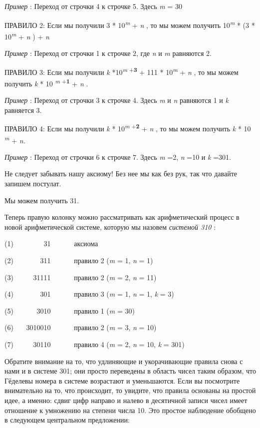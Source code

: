 \documentclass[../main.tex]{subfiles}
\begin{document}
\emph{Пример} : Переход от строчки 4 к строчке 5. Здесь \emph{m} = 30

ПРАВИЛО 2: Если мы получили 3 * 10\textsuperscript{\emph{m}} + \emph{n} , то мы можем получить 10\textsuperscript{\emph{m}} * (3 * 10\textsuperscript{\emph{m}} + \emph{n} ) + \emph{n}

\emph{Пример} : Переход от строчки 1 к строчке 2, где \emph{n} и \emph{m} равняются 2.

ПРАВИЛО 3: Если мы получили \emph{k} *10\textsuperscript{\emph{m} +\textbf{3}} + 111 * 10\textsuperscript{\emph{m}} + \emph{n} , то мы можем получить \emph{k} * 10 \textsuperscript{\emph{m} +\textbf{1}} + \emph{n} .

\emph{Пример} : Переход от строчки 3 к строчке 4. Здесь \emph{m} и \emph{n} равняются 1 и \emph{k} равняется 3.

ПРАВИЛО 4: Если мы получили \emph{k} * 10\textsuperscript{\emph{m} +\textbf{2}} + \emph{n} , то мы можем получить \emph{k} * 10 \textsuperscript{\emph{m}} + \emph{n.}

\emph{Пример} : Переход от строчки 6 к строчке 7. Здесь \emph{m} =2, \emph{n} =10 и \emph{k} =301.

Не следует забывать нашу аксиому! Без нее мы как без рук, так что давайте запишем постулат.

Мы можем получить 31.

Теперь правую колонку можно рассматривать как арифметический процесс в новой арифметической системе, которую мы назовем \emph{системой 310} :

(1)~~~~~~~~ 31~~~~~~ аксиома

(2)~~~~~~~ 311~~~~~~ правило 2 (\emph{m} = 1, \emph{n} = 1)

(3)~~~~~ 31111~~~~~~ правило 2 (\emph{m} = 2, \emph{n} = 11)

(4)~~~~~~~ 301~~~~~~ правило 3 (\emph{m} = 1, \emph{n} = 1, \emph{k} = 3)

(5)~~~~~~ 3010~~~~~~ правило 1 (\emph{m} = 30)

(6)~~~ 3010010~~~~~~ правило 2 (\emph{m} = 3, \emph{n} = 10)

(7)~~~~~ 30110~~~~~~ правило 4 (\emph{m} = 2, \emph{n} = 10, \emph{k} = 301)

Обратите внимание на то, что удлиняющие и укорачивающие правила снова с нами и в системе 301; они просто переведены в область чисел таким образом, что Гёделевы номера в системе возрастают и уменьшаются. Если вы посмотрите внимательно на то, что происходит, то увидите, что правила основаны на простой идее, а именно: сдвиг цифр направо и налево в десятичной записи чисел имеет отношение к умножению на степени числа 10. Это простое наблюдение обобщено в следующем центральном предложении:
\end{document}
